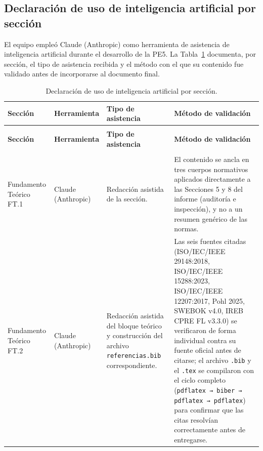 \documentclass[journal,onecolumn]{IEEEtran}
\begin{document}
\subsection*{Declaración de uso de inteligencia artificial por sección}
\label{sec:declaracion-ia}

El equipo empleó Claude (Anthropic) como herramienta de asistencia de
inteligencia artificial durante el desarrollo de la PE5. La
Tabla~\ref{tab:declaracion-ia} documenta, por sección, el tipo de
asistencia recibida y el método con el que su contenido fue validado antes
de incorporarse al documento final.

\renewcommand{\arraystretch}{1.3}
\footnotesize
\begin{longtable}{
	|>{\raggedright\arraybackslash}p{3.2cm}
	|>{\raggedright\arraybackslash}p{1.8cm}
	|>{\raggedright\arraybackslash}p{4.3cm}
	|>{\raggedright\arraybackslash}p{5cm}|}
	\caption{Declaración de uso de inteligencia artificial por sección.}
	\label{tab:declaracion-ia} \\
	\hline
	\textbf{Sección} & \textbf{Herramienta} & \textbf{Tipo de asistencia} & \textbf{Método de validación} \\
	\hline
	\endfirsthead
	\multicolumn{4}{l}{\small\itshape (continuación de la Tabla~\ref{tab:declaracion-ia})} \\
	\hline
	\textbf{Sección} & \textbf{Herramienta} & \textbf{Tipo de asistencia} & \textbf{Método de validación} \\
	\hline
	\endhead
	\hline
	\multicolumn{4}{r}{\small\itshape (continúa en la página siguiente)} \\
	\endfoot
	\hline
	\endlastfoot
	Fundamento Teórico FT.1 &
	Claude (Anthropic) &
	Redacción asistida de la sección. &
	El contenido se ancla en tres cuerpos normativos aplicados
	directamente a las Secciones 5 y 8 del informe (auditoría e
	inspección), y no a un resumen genérico de las normas. \\
	\hline
	Fundamento Teórico FT.2 &
	Claude (Anthropic) &
	Redacción asistida del bloque teórico y construcción del archivo
	\texttt{referencias.bib} correspondiente. &
	Las seis fuentes citadas (ISO/IEC/IEEE 29148:2018, ISO/IEC/IEEE
	15288:2023, ISO/IEC/IEEE 12207:2017, Pohl 2025, SWEBOK v4.0, IREB
	CPRE FL v3.3.0) se verificaron de forma individual contra su
	fuente oficial antes de citarse; el archivo \texttt{.bib} y el
	\texttt{.tex} se compilaron con el ciclo completo (\texttt{pdflatex
	→ biber → pdflatex → pdflatex}) para confirmar que las citas
	resolvían correctamente antes de entregarse. \\

\end{longtable}
\end{document}
